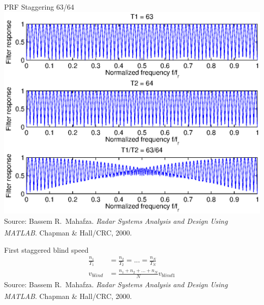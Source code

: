 \documentclass[mathserif]{beamer}
\begin{document}
   
    \begin{frame}{PRF Staggering 63/64}
    \includegraphics[width=\linewidth]{prfStaggering63_64} \\
      \tiny{Source: Bassem R.~Mahafza. \emph{Radar Systems Analysis and Design Using MATLAB\textsuperscript{\textregistered}}. Chapman \& Hall/CRC, 2000.}
    \end{frame}
    
    \begin{frame}{First staggered blind speed}
     \begin{align}
      \frac{n_1}{T_1} & = \frac{n_2}{T_2} = ... = \frac{n_N}{T_N} \nonumber \\
      v_{blind} & = \frac{n_1 + n_2 + ... + n_N}{N} v_{blind1} \nonumber
     \end{align}
     \vfill
      \tiny{Source: Bassem R.~Mahafza. \emph{Radar Systems Analysis and Design Using MATLAB\textsuperscript{\textregistered}}. Chapman \& Hall/CRC, 2000.}

    \end{frame}

    
    
\end{document}
